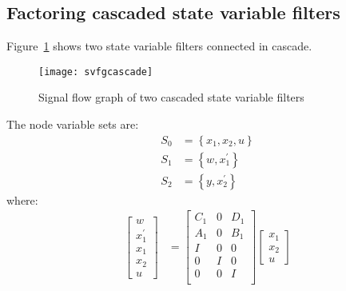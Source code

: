 \documentclass[a4paper,twoside,10pt,english]{report}
\begin{document}
\subsection{Factoring cascaded state variable filters}
Figure~\ref{fig:Cascaded-SVFG} shows two state variable filters connected in 
cascade. 
\begin{figure}[!htbp]
\begin{center}
\texttt{[image: svfgcascade]}
\caption{Signal flow graph of two cascaded state variable filters}
\label{fig:Cascaded-SVFG}
\end{center}
\end{figure}
The node variable sets are:
\begin{align*}
S_{0} &= \left\{ x_{1} , x_{2} , u \right\}\\ 
S_{1} &= \left\{ w, x^{\prime}_{1} \right\}\\
S_{2} &= \left\{ y, x^{\prime}_{2} \right\}
\end{align*}
where:
\begin{align*}
\left[\begin{array}{c}
w\\
x^{\prime}_{1}\\
x_{1}\\ 
x_{2}\\
u
\end{array}\right] 
&= 
\left[\begin{array}{ccc}
C_{1} & 0 & D_{1}\\
A_{1} & 0 & B_{1}\\
I & 0 & 0\\
0 & I & 0\\
0 & 0 & I\\
\end{array}\right]
\left[\begin{array}{c}
x_{1}\\
x_{2}\\
u
\end{array}\right] 
\end{align*}
\end{document}
